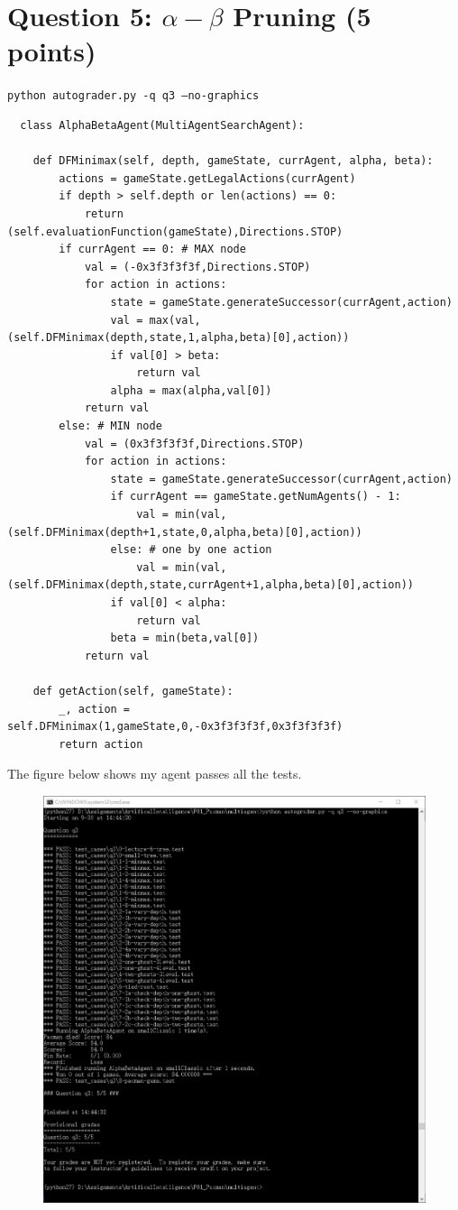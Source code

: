 \documentclass[a4paper, 11pt]{article}
\begin{document}
\section{Question 5: $\alpha-\beta$ Pruning (5 points)}
\texttt{python autograder.py -q q3 --no-graphics}
\begin{lstlisting}
  class AlphaBetaAgent(MultiAgentSearchAgent):

    def DFMinimax(self, depth, gameState, currAgent, alpha, beta):
        actions = gameState.getLegalActions(currAgent)
        if depth > self.depth or len(actions) == 0:
            return (self.evaluationFunction(gameState),Directions.STOP)
        if currAgent == 0: # MAX node
            val = (-0x3f3f3f3f,Directions.STOP)
            for action in actions:
                state = gameState.generateSuccessor(currAgent,action)
                val = max(val,(self.DFMinimax(depth,state,1,alpha,beta)[0],action))
                if val[0] > beta:
                    return val
                alpha = max(alpha,val[0])
            return val
        else: # MIN node
            val = (0x3f3f3f3f,Directions.STOP)
            for action in actions:
                state = gameState.generateSuccessor(currAgent,action)
                if currAgent == gameState.getNumAgents() - 1:
                    val = min(val,(self.DFMinimax(depth+1,state,0,alpha,beta)[0],action))
                else: # one by one action
                    val = min(val,(self.DFMinimax(depth,state,currAgent+1,alpha,beta)[0],action))
                if val[0] < alpha:
                    return val
                beta = min(beta,val[0])
            return val

    def getAction(self, gameState):
        _, action = self.DFMinimax(1,gameState,0,-0x3f3f3f3f,0x3f3f3f3f)
        return action
\end{lstlisting}

The figure below shows my agent passes all the tests.
\begin{figure}[H]
  \centering
  \includegraphics[width=\linewidth]{fig/Q5.png}
\end{figure}
\end{document}
